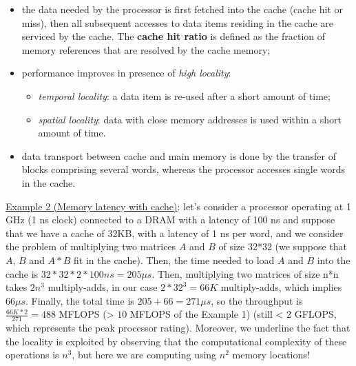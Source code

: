 \begin{itemize}

    \item the data needed by the processor is first fetched into the cache (cache hit or miss), then all subsequent accesses to data items residing in the cache are serviced by the cache. The \textbf{cache hit ratio} is defined as the fraction of memory references that are resolved by the cache memory;
    
    \item performance improves in presence of \textit{high locality}:

    \begin{itemize}
    
        \item \textit{temporal locality}: a data item is re-used after a short amount of time;

        \item \textit{spatial locality}: data with close memory addresses is used within a short amount of time.
        
    \end{itemize}

    \item data transport between cache and main memory is done by the transfer of blocks comprising several words, whereas the processor accesses single words in the cache.
    
    
\end{itemize}

\underline{Example 2 (Memory latency with cache)}: let's consider a processor operating at 1 GHz (1 ns clock) connected to a DRAM with a latency of 100 ns and suppose that we have a cache of 32KB, with a latency of 1 ns per word, and we consider the problem of multiplying two matrices $A$ and $B$ of size 32*32 (we suppose that $A$, $B$ and $A * B$ fit in the cache). Then, the time needed to load $A$ and $B$ into the cache is $32*32*2* 100 ns = 205 \mu s$. Then, multiplying two matrices of size n*n takes $2n^3$ multiply-adds, in our case $2*32^3 = 66K$ multiply-adds, which implies $66 \mu s$. Finally, the total time is $205 + 66 = 271 \mu s$, so the throughput is $\frac{66K * 2}{271} = 488$ MFLOPS (> $10$ MFLOPS of the Example 1) (still < $2$ GFLOPS, which represents the peak processor rating). Moreover, we underline the fact that the locality is exploited by observing that the computational complexity of these operations is $n^3$, but here we are computing using $n^2$ memory locations!


